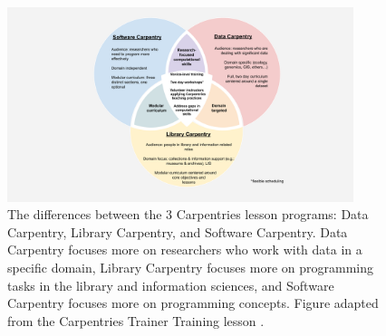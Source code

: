 \documentclass[010-intro.tex]{subfiles}
\begin{document}
        
        \begin{figure}[htb]
            \centering
            \includegraphics[width=0.9\textwidth]{figs/050-intro/carpentries-venn-diagram_20200904}
            \caption[Differences between Carpentries Lesson programs]{
            The differences between the 3 Carpentries lesson programs: Data Carpentry, Library Carpentry, and Software Carpentry.
            Data Carpentry focuses more on researchers who work with data in a specific domain,
            Library Carpentry focuses more on programming tasks in the library and information sciences, and
            Software Carpentry focuses more on programming concepts.
            Figure adapted from the Carpentries Trainer Training lesson \cite{CarpentryTrainerTraining}.
            }
            \label{fig:carpentries-venn}
        \end{figure}
        
        
        
\end{document}
